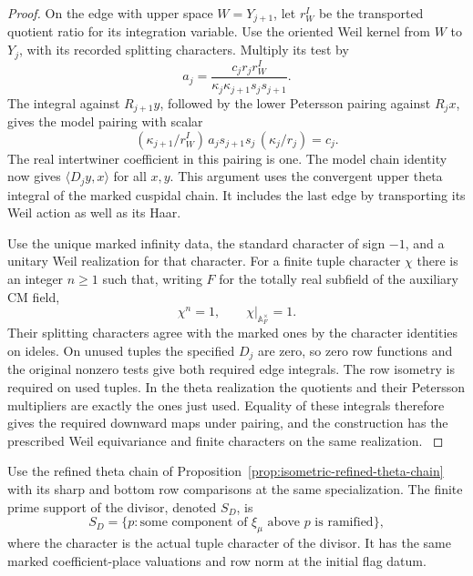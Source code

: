 \begin{proof}
On the edge with upper space \(W=Y_{j+1}\), let \(r_W^I\)
be the transported quotient ratio for its integration variable.
Use the oriented Weil kernel from \(W\) to \(Y_j\), with its
recorded splitting characters. Multiply its test by
\[
 a_j=\frac{c_jr_j r_W^I}{\kappa_j\kappa_{j+1}s_js_{j+1}} .
\]
The integral against \(R_{j+1}y\), followed by the lower
Petersson pairing against \(R_jx\), gives the model pairing
with scalar
\[
 (\kappa_{j+1}/r_W^I)\, a_js_{j+1}s_j\,(\kappa_j/r_j)=c_j .
\]
The real intertwiner coefficient in this pairing is one.
The model chain identity now gives \(\langle D_jy,x\rangle\)
for all \(x,y\). This argument uses the convergent upper
theta integral of the marked cuspidal chain. It includes the
last edge by transporting its Weil action as well as its Haar.

Use the unique marked infinity data, the standard character of
sign \(-1\), and a unitary Weil realization for that character.
For a finite tuple character \(\chi\) there is an integer \(n\ge1\) such that, writing \(F\) for the totally real subfield of the auxiliary CM field,
\[
 \chi^n=1,\qquad \chi|_{\mathbb A_F^\times}=1 .
\] Their splitting characters
agree with the marked ones by the character identities on
ideles. On unused tuples the specified \(D_j\) are zero, so zero
row functions and the original nonzero tests give both required
edge integrals. The row isometry is required on used tuples.
In the theta realization the quotients and their Petersson
multipliers are exactly the ones just used. Equality of these
integrals therefore gives the required downward maps under
pairing, and the construction has the prescribed Weil
equivariance and finite characters on the same realization.
\label{cor:level-four-core-2}
\end{proof}

\begin{proposition}\label{prop:core-divisor-support}
Use the refined theta chain of
Proposition~\ref{prop:isometric-refined-theta-chain} with
its sharp and bottom row comparisons at the same specialization.
The finite prime support of the divisor, denoted \(S_D\), is
\[
 S_D=\{p:\text{some component of }\xi_\mu\text{ above }p\text{ is ramified}\},
\]
where the character is the actual tuple character of the divisor. It has the same marked
coefficient-place valuations and row norm at the
initial flag datum.
\end{proposition}

